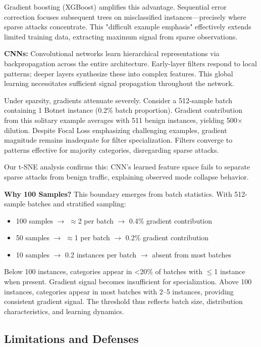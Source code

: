 \documentclass[10pt,twocolumn]{article}
\begin{document}
Gradient boosting (XGBoost) amplifies this advantage. Sequential error correction focuses subsequent trees on misclassified instances—precisely where sparse attacks concentrate. This "difficult example emphasis" effectively extends limited training data, extracting maximum signal from sparse observations.

\textbf{CNNs:} Convolutional networks learn hierarchical representations via backpropagation across the entire architecture. Early-layer filters respond to local patterns; deeper layers synthesize these into complex features. This global learning necessitates sufficient signal propagation throughout the network.

Under sparsity, gradients attenuate severely. Consider a 512-sample batch containing 1 Botnet instance (0.2\% batch proportion). Gradient contribution from this solitary example averages with 511 benign instances, yielding 500× dilution. Despite Focal Loss emphasizing challenging examples, gradient magnitude remains inadequate for filter specialization. Filters converge to patterns effective for majority categories, disregarding sparse attacks.

Our t-SNE analysis confirms this: CNN's learned feature space fails to separate sparse attacks from benign traffic, explaining observed mode collapse behavior.

\textbf{Why 100 Samples?} This boundary emerges from batch statistics. With 512-sample batches and stratified sampling:
\begin{itemize}
    \item 100 samples $\rightarrow$ $\approx$2 per batch $\rightarrow$ 0.4\% gradient contribution
    \item 50 samples $\rightarrow$ $\approx$1 per batch $\rightarrow$ 0.2\% gradient contribution
    \item 10 samples $\rightarrow$ 0.2 instances per batch $\rightarrow$ absent from most batches
\end{itemize}

Below 100 instances, categories appear in <20\% of batches with $\leq$1 instance when present. Gradient signal becomes insufficient for specialization. Above 100 instances, categories appear in most batches with 2--5 instances, providing consistent gradient signal. The threshold thus reflects batch size, distribution characteristics, and learning dynamics.

\subsection{Limitations and Defenses}
\end{document}
